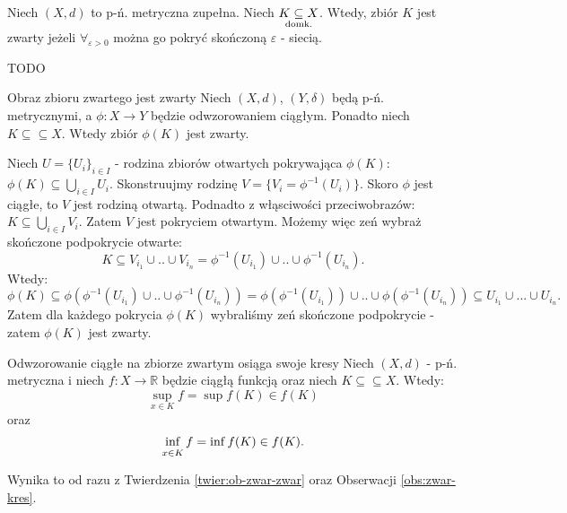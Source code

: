 \documentclass{article}
\numberwithin{defi}{section}
\numberwithin{defi}{section}
\newcommand{\R}{\mathbb{R}}
\newcommand{\subdomk}{\underset{\clap{\scriptsize domk.}}{\subseteq}}
\newcommand{\se}{\subseteq}
\renewcommand{\inf}{\mathop{\mathrm{inf}\vphantom{\mathrm{sup}}}}
\providecommand{\eps}{\varepsilon}
\begin{document}
    \begin{twier}{}
        Niech $(X, d)$ to p-ń. metryczna zupełna. Niech $K \subdomk X$. Wtedy, zbiór $K$ jest zwarty jeżeli $\forall_{\eps >0}$ można go pokryć skończoną $\eps$ - siecią.
    \end{twier}
    \begin{dow}
        TODO
    \end{dow}


\begin{twier}[label=twier:ob-zwar-zwar]{Obraz zbioru zwartego jest zwarty}
    Niech $(X, d)$, $(Y, \delta)$ będą p-ń. metrycznymi, a $\phi: X \to Y$ będzie odwzorowaniem ciągłym. Ponadto niech $K \subseteq \subseteq X$. Wtedy zbiór $\phi(K)$ jest zwarty.
\end{twier}


\begin{dow}
    Niech $U = \{ U_i \}_{i \in I}$ - rodzina zbiorów otwartych pokrywająca $\phi(K)$: $\phi(K) \se \bigcup_{i \in I} U_i $. Skonstruujmy rodzinę $V = \{ V_i = \phi^{-1}(U_i) \}$. Skoro $\phi$ jest ciągłe, to $V$ jest rodziną otwartą. Podnadto z włąsciwości przeciwobrazów: $K \se \bigcup_{i \in I}V_i$. Zatem $V$ jest pokryciem otwartym. Możemy więc zeń wybraż skończone podpokrycie otwarte: \begin{equation*}
        K \se V_{i_1} \cup .. \cup V_{i_n} = \phi^{-1}(U_{i_1}) \cup .. \cup \phi^{-1}(U_{i_n}).
    \end{equation*} Wtedy: \begin{equation*}
        \phi(K) \se \phi(\phi^{-1}(U_{i_1}) \cup .. \cup \phi^{-1}(U_{i_n})) = \phi(\phi^{-1}(U_{i_1})) \cup .. \cup \phi(\phi^{-1}(U_{i_n})) \se U_{i_1} \cup ... \cup U_{i_n}.
    \end{equation*} Zatem dla każdego pokrycia $\phi(K)$ wybraliśmy zeń skończone podpokrycie - zatem $\phi(K)$ jest zwarty.
\end{dow}

\begin{obs}{Odwzorowanie ciągłe na zbiorze zwartym osiąga swoje kresy}
    Niech $(X, d)$ - p-ń. metryczna i niech $f: X \to \R$ będzie ciągłą funkcją oraz niech $K \se \se X$. Wtedy: \begin{equation}
        \sup_{x \in K} f = \sup f(K) \in f(K) 
    \end{equation} oraz\begin{equation}
        \inf_{x \in K} f = \inf f(K) \in f(K).
    \end{equation}
\end{obs}
    Wynika to od razu z Twierdzenia \ref{twier:ob-zwar-zwar} oraz Obserwacji \ref{obs:zwar-kres}.
    
\end{document}
